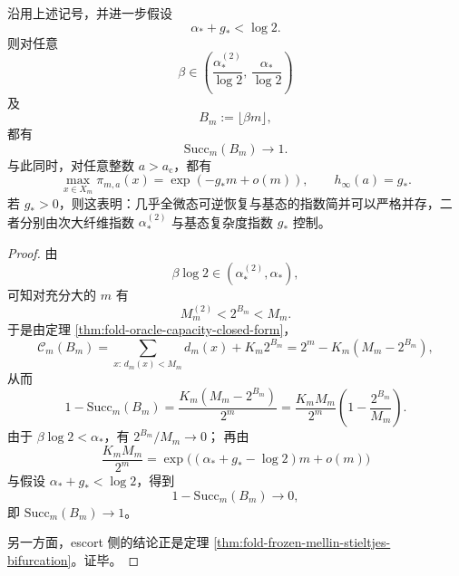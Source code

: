 \begin{corollary}[次最大恢复窗与基态指数简并的并存]\label{cor:fold-submaximal-recovery-window-groundstate-degeneracy}
沿用上述记号，并进一步假设
\[
\alpha_*+g_*<\log 2.
\]
则对任意
\[
\beta\in\left(\frac{\alpha_*^{(2)}}{\log 2},\,\frac{\alpha_*}{\log 2}\right)
\]
及
\[
B_m:=\lfloor \beta m\rfloor,
\]
都有
\[
\mathrm{Succ}_m(B_m)\longrightarrow 1.
\]
与此同时，对任意整数 \(a>a_{\mathrm c}\)，都有
\[
\max_{x\in X_m}\pi_{m,a}(x)=\exp(-g_*m+o(m)),
\qquad
h_\infty(a)=g_*.
\]
若 \(g_*>0\)，则这表明：几乎全微态可逆恢复与基态的指数简并可以严格并存，二者分别由次大纤维指数 \(\alpha_*^{(2)}\) 与基态复杂度指数 \(g_*\) 控制。
\end{corollary}
\begin{proof}
由
\[
\beta\log 2\in(\alpha_*^{(2)},\alpha_*),
\]
可知对充分大的 \(m\) 有
\[
M_m^{(2)}<2^{B_m}<M_m.
\]
于是由定理 \ref{thm:fold-oracle-capacity-closed-form}，
\[
\mathcal C_m(B_m)
=\sum_{x:\,d_m(x)<M_m}d_m(x)+K_m2^{B_m}
=2^m-K_m(M_m-2^{B_m}),
\]
从而
\[
1-\mathrm{Succ}_m(B_m)
=\frac{K_m(M_m-2^{B_m})}{2^m}
=\frac{K_mM_m}{2^m}\left(1-\frac{2^{B_m}}{M_m}\right).
\]
由于 \(\beta\log 2<\alpha_*\)，有 \(2^{B_m}/M_m\to 0\)；
再由
\[
\frac{K_mM_m}{2^m}
=\exp\!\bigl((\alpha_*+g_*-\log 2)m+o(m)\bigr)
\]
与假设 \(\alpha_*+g_*<\log 2\)，得到
\[
1-\mathrm{Succ}_m(B_m)\to 0,
\]
即 \(\mathrm{Succ}_m(B_m)\to 1\)。

另一方面，escort 侧的结论正是定理 \ref{thm:fold-frozen-mellin-stieltjes-bifurcation}。证毕。
\end{proof}

\endinput
